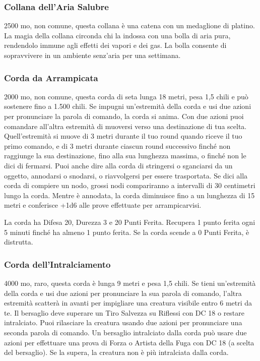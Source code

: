 \begin{multicols}{2}
	\subsubsection*{Collana dell’Aria Salubre}
	2500 mo, non comune, questa collana è una catena con un medaglione di platino. La magia della collana circonda chi la indossa con una bolla di aria pura, rendendolo immune agli effetti dei vapori e dei gas. La bolla consente di sopravvivere in un ambiente senz’aria per una settimana.

	\subsubsection*{Corda da Arrampicata}
	2000 mo, non comune, questa corda di seta lunga 18 metri, pesa 1,5 chili e può sostenere fino a 1.500 chili. Se impugni un'estremità della corda e usi due azioni per pronunciare la parola di comando, la corda si anima. Con due azioni puoi comandare all'altra estremità di muoversi verso una destinazione di tua scelta. Quell'estremità si muove di 3 metri durante il tuo round quando riceve il tuo primo comando, e di 3 metri durante ciascun round successivo finché non raggiunge la sua destinazione, fino alla sua lunghezza massima, o finché non le dici di fermarsi. Puoi anche dire alla corda di stringersi o sganciarsi da un oggetto, annodarsi o snodarsi, o riavvolgersi per essere trasportata. Se dici alla corda di compiere un nodo, grossi nodi compariranno a intervalli di 30 centimetri lungo la corda. Mentre è annodata, la corda diminuisce fino a un lunghezza di 15 metri e conferisce +1d6 alle prove effettuate per arrampicarvisi.

	La corda ha Difesa 20, Durezza 3 e 20 Punti Ferita. Recupera 1 punto ferita ogni 5 minuti finché ha almeno 1 punto ferita. Se la corda scende a 0 Punti Ferita, è distrutta.

	\subsubsection*{Corda dell'Intralciamento}
	4000 mo, raro, questa corda è lunga 9 metri e pesa 1,5 chili. Se tieni un'estremità della corda e usi due azioni per pronunciare la sua parola di comando, l'altra estremità scatterà in avanti per impigliare una creatura visibile entro 6 metri da te. Il bersaglio deve superare un Tiro Salvezza su Riflessi con DC 18 o restare intralciato. Puoi rilasciare la creatura usando due azioni per pronunciare una seconda parola di comando. Un bersaglio intralciato dalla corda può usare due azioni per effettuare una prova di Forza o Artista della Fuga con DC 18 (a scelta del bersaglio). Se la supera, la creatura non è più intralciata dalla corda.


\end{multicols}
